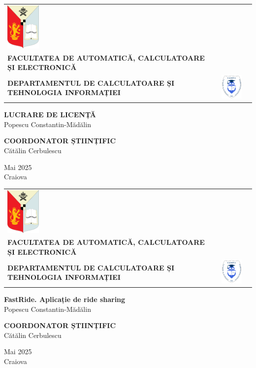 \newcommand{\headerpage}[1]
{
\begin{center}
  \begin{tabular}{m{2cm} m{10cm} m{2cm}}
    \includegraphics[width=1.7cm]{Assets/left-logo.png} &
    \centering
    {\fontsize{10pt}{10pt}\selectfont
      \textbf{UNIVERSITATEA DIN CRAIOVA} \\[0.3em]
      \textbf{FACULTATEA DE AUTOMATICĂ, CALCULATOARE ȘI ELECTRONICĂ} \\[0.7em]
      \textbf{DEPARTAMENTUL DE CALCULATOARE ȘI TEHNOLOGIA INFORMAȚIEI}
    } &
    \includegraphics[width=1.7cm]{Assets/right-logo.png}
  \end{tabular}
\end{center}

\vspace{4cm}

\begin{center}
  {\fontsize{14pt}{14pt}\selectfont
   \textbf{#1} \\[1em]
  {Popescu Constantin-Mădălin}
  }
\end{center}

\vspace{3cm}

\begin{center}
   {\fontsize{12pt}{12pt}\selectfont
   \textbf{COORDONATOR ȘTIINȚIFIC} \\[1em]
   { Cătălin Cerbulescu}
   }
\end{center}

\vfill

\begin{center}
  {\fontsize{12pt}{12pt}\selectfont Mai 2025 \\
  Craiova}
\end{center}
}

\thispagestyle{empty}
\headerpage{LUCRARE DE LICENȚĂ}

\newpage
\thispagestyle{empty}
\headerpage{FastRide. Aplicație de ride sharing}

\newpage
\thispagestyle{empty}
\null
\newpage